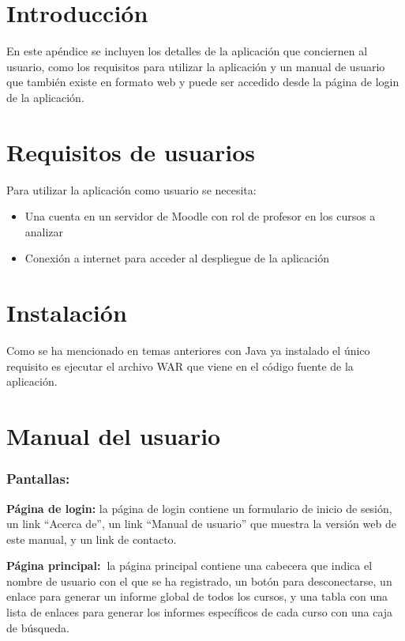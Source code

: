 
\section{Introducción}
En este apéndice se incluyen los detalles de la aplicación que conciernen al usuario, como los requisitos para utilizar la aplicación y un manual de usuario que también existe en formato web y puede ser accedido desde la página de login de la aplicación.
\section{Requisitos de usuarios}
Para utilizar la aplicación como usuario se necesita:
\begin{itemize}
	\item Una cuenta en un servidor de Moodle con rol de profesor en los cursos a analizar
	\item Conexión a internet para acceder al despliegue de la aplicación
\end{itemize}
\section{Instalación}
Como se ha mencionado en temas anteriores con Java ya instalado el único requisito es ejecutar el archivo WAR que viene en el código fuente de la aplicación.
\section{Manual del usuario}

\subsubsection{Pantallas:}

\textbf{Página de login:} la página de login contiene un formulario de
inicio de sesión, un link ``Acerca de'', un link ``Manual de usuario'' que
muestra la versión web de este manual, y un link de contacto.

\textbf{Página principal:~}la página principal contiene una cabecera que
indica el nombre de usuario con el que se ha registrado, un botón para
desconectarse, un enlace para generar un informe global de todos los
cursos, y una tabla con una lista de enlaces para generar los informes
específicos de cada curso con una caja de búsqueda.

